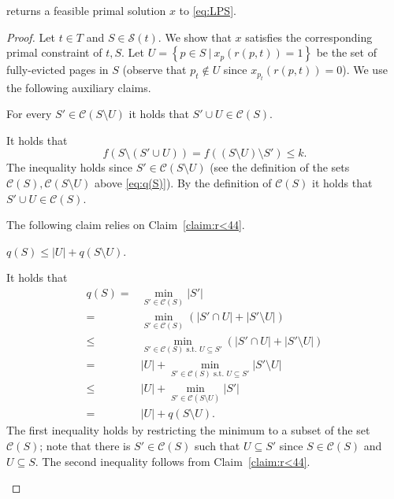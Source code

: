 \documentclass[11pt]{article}
\newcommand{\cC}{{\mathcal{C}}}
\newcommand{\cS}{{\mathcal{S}}}
\begin{document}
	\begin{lemma}
	\label{lem:PFeasibleS}
	 returns a feasible primal solution $x$ to \eqref{eq:LPS}. 
\end{lemma}

\begin{proof}
	Let $t \in T$ and $S \in \cS(t)$. We show that $x$ satisfies the corresponding primal constraint of $t,S$. Let $U = \left\{p \in S~|~x_p(r(p,t)) = 1\right\}$ be the set of fully-evicted pages in $S$ (observe that $p_t \notin U$ since $x_{p_t}(r(p,t)) = 0$). We use the following auxiliary claims. 
	
		\begin{claim}
		\label{claim:r<44}
		For every $S' \in \cC(S \setminus U)$ it holds that $S' \cup U \in \cC(S)$.
	\end{claim}
	\begin{claimproof}
		It holds that 
		$$f \left(S \setminus \left(S' \cup U\right)\right) = f \left((S \setminus U) \setminus S'\right) \leq k.$$
		The inequality holds since $S' \in \cC(S \setminus U)$ (see the definition of the sets $\cC(S),\cC(S \setminus U)$ above \eqref{eq:q(S)}). By the definition of $\cC(S)$ it holds that $S' \cup U \in \cC(S)$.
	\end{claimproof}
	The following claim relies on Claim~\ref{claim:r<44}. 
		\begin{claim}
		\label{claim:r<45}
	$q(S) \leq |U|+q(S \setminus U)$. 
	\end{claim}
	\begin{claimproof}
		It holds that 
		\begin{equation*}
			\begin{aligned}
			q(S) ={} & \min_{S' \in \cC(S)} |S'| 
			\\={} & \min_{S' \in \cC(S)} \left( |S' \cap U|+|S' \setminus U| \right) 
			\\\leq{} &  
			\min_{S' \in \cC(S) \text{ s.t. } U \subseteq S'} \left( |S' \cap U|+|S' \setminus U| \right) 
				\\={} &  
				|U|+\min_{S' \in \cC(S) \text{ s.t. } U \subseteq S'}|S' \setminus U| 
					\\\leq{} &  
				|U|+\min_{S' \in \cC(S \setminus U)} |S'| 
					\\={} &  
				|U|+q(S \setminus U). 
			\end{aligned}
		\end{equation*} The first inequality holds by restricting the minimum to a subset of the set $\cC(S)$; note that there is $S' \in \cC(S)$ such that $U \subseteq S'$ since $S \in \cC(S)$ and $U \subseteq S$. The second inequality follows from Claim~\ref{claim:r<44}. 
	\end{claimproof}
	

\end{proof}
\end{document}
